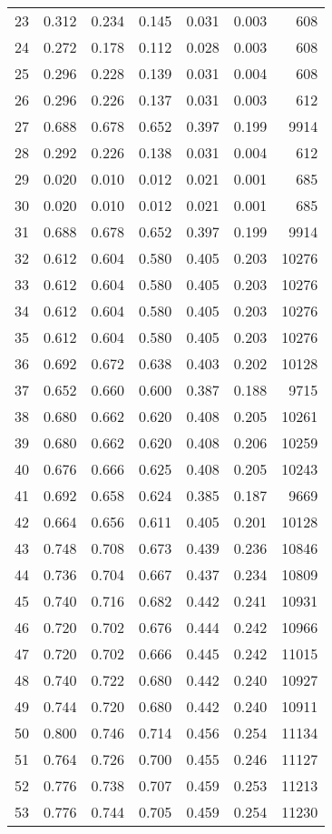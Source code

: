 \documentclass[runningheads]{llncs}
\begin{document}
\begin{tabular}{l l l l l l r}
    23 & 0.312 & 0.234 & 0.145 & 0.031 & 0.003 & 608 \\
    24 & 0.272 & 0.178 & 0.112 & 0.028 & 0.003 & 608 \\
    25 & 0.296 & 0.228 & 0.139 & 0.031 & 0.004 & 608 \\
    26 & 0.296 & 0.226 & 0.137 & 0.031 & 0.003 & 612 \\
    27 & 0.688 & 0.678 & 0.652 & 0.397 & 0.199 & 9914 \\
    28 & 0.292 & 0.226 & 0.138 & 0.031 & 0.004 & 612 \\
    29 & 0.020 & 0.010 & 0.012 & 0.021 & 0.001 & 685 \\
    30 & 0.020 & 0.010 & 0.012 & 0.021 & 0.001 & 685 \\
    31 & 0.688 & 0.678 & 0.652 & 0.397 & 0.199 & 9914 \\
    32 & 0.612 & 0.604 & 0.580 & 0.405 & 0.203 & 10276 \\
    33 & 0.612 & 0.604 & 0.580 & 0.405 & 0.203 & 10276 \\
    34 & 0.612 & 0.604 & 0.580 & 0.405 & 0.203 & 10276 \\
    35 & 0.612 & 0.604 & 0.580 & 0.405 & 0.203 & 10276 \\
    36 & 0.692 & 0.672 & 0.638 & 0.403 & 0.202 & 10128 \\
    37 & 0.652 & 0.660 & 0.600 & 0.387 & 0.188 & 9715 \\
    38 & 0.680 & 0.662 & 0.620 & 0.408 & 0.205 & 10261 \\
    39 & 0.680 & 0.662 & 0.620 & 0.408 & 0.206 & 10259 \\
    40 & 0.676 & 0.666 & 0.625 & 0.408 & 0.205 & 10243 \\
    41 & 0.692 & 0.658 & 0.624 & 0.385 & 0.187 & 9669 \\
    42 & 0.664 & 0.656 & 0.611 & 0.405 & 0.201 & 10128 \\
    43 & 0.748 & 0.708 & 0.673 & 0.439 & 0.236 & 10846 \\
    44 & 0.736 & 0.704 & 0.667 & 0.437 & 0.234 & 10809 \\
    45 & 0.740 & 0.716 & 0.682 & 0.442 & 0.241 & 10931 \\
    46 & 0.720 & 0.702 & 0.676 & 0.444 & 0.242 & 10966 \\
    47 & 0.720 & 0.702 & 0.666 & 0.445 & 0.242 & 11015 \\
    48 & 0.740 & 0.722 & 0.680 & 0.442 & 0.240 & 10927 \\
    49 & 0.744 & 0.720 & 0.680 & 0.442 & 0.240 & 10911 \\
    50 & {\cellcolor{lightgreen}} 0.800 & {\cellcolor{lightgreen}} 0.746 & {\cellcolor{lightgreen}} 0.714 & 0.456 & {\cellcolor{lightgreen}} 0.254 & 11134 \\
    51 & 0.764 & 0.726 & 0.700 & 0.455 & 0.246 & 11127 \\
    52 & 0.776 & 0.738 & 0.707 & {\cellcolor{lightgreen}} 0.459 & 0.253 & 11213 \\
    53 & 0.776 & 0.744 & 0.705 & {\cellcolor{lightgreen}} 0.459 & 0.254 & {\cellcolor{lightgreen}} 11230 \\
    \end{tabular}
    
\end{document}
